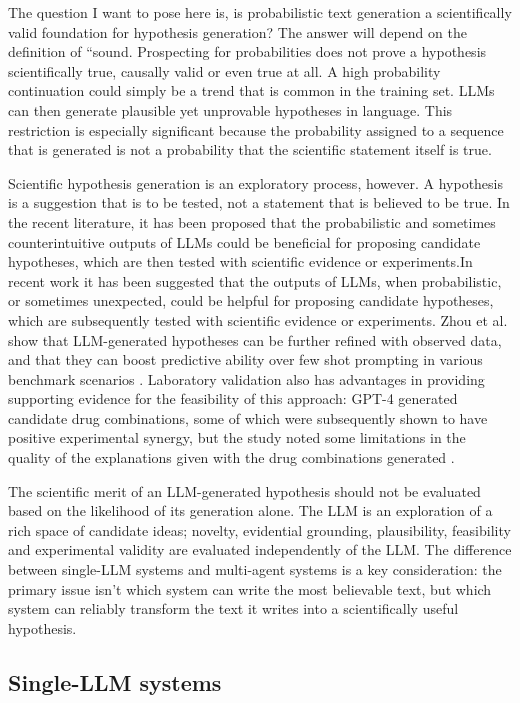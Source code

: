 \documentclass[acmsmall,screen,review]{acmart}
\begin{document}
The question I want to pose here is, is probabilistic text generation a scientifically valid foundation for hypothesis generation? The answer will depend on the definition of ``sound. Prospecting for probabilities does not prove a hypothesis scientifically true, causally valid or even true at all. A high probability continuation could simply be a trend that is common in the training set. LLMs can then generate plausible yet unprovable hypotheses in language. This restriction is especially significant because the probability assigned to a sequence that is generated is not a probability that the scientific statement itself is true.

Scientific hypothesis generation is an exploratory process, however. A hypothesis is a suggestion that is to be tested, not a statement that is believed to be true. In the recent literature, it has been proposed that the probabilistic and sometimes counterintuitive outputs of LLMs could be beneficial for proposing candidate hypotheses, which are then tested with scientific evidence or experiments.In recent work it has been suggested that the outputs of LLMs, when probabilistic, or sometimes unexpected, could be helpful for proposing candidate hypotheses, which are subsequently tested with scientific evidence or experiments. Zhou et al. show that LLM-generated hypotheses can be further refined with observed data, and that they can boost predictive ability over few shot prompting in various benchmark scenarios \cite{zhou2024hypothesis}. Laboratory validation also has advantages in providing supporting evidence for the feasibility of this approach: GPT-4 generated candidate drug combinations, some of which were subsequently shown to have positive experimental synergy, but the study noted some limitations in the quality of the explanations given with the drug combinations generated \cite{abdelrehim2025scientific}.

The scientific merit of an LLM-generated hypothesis should not be evaluated based on the likelihood of its generation alone. The LLM is an exploration of a rich space of candidate ideas; novelty, evidential grounding, plausibility, feasibility and experimental validity are evaluated independently of the LLM. The difference between single-LLM systems and multi-agent systems is a key consideration: the primary issue isn't which system can write the most believable text, but which system can reliably transform the text it writes into a scientifically useful hypothesis.

\subsection{Single-LLM systems}
\label{subsec:single-llm}
\end{document}
